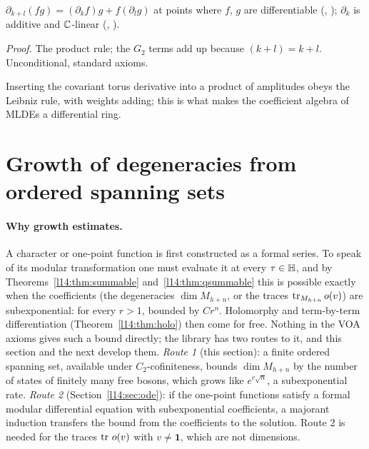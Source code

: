 \begin{proposition}\label{l14:prop:serremul}
$\partial_{k+l}(fg) = (\partial_kf)g + f(\partial_lg)$ at points where $f$, $g$ are differentiable
(, ); $\partial_k$ is additive and ${\mathbb{C}}$-linear
(, ).
\end{proposition}
\noindent\emph{Proof.} The product rule; the $G_2$ terms add up because $(k+l) = k + l$. Unconditional, standard axioms.
\begin{physics}
Inserting the covariant torus derivative into a product of amplitudes obeys the Leibniz rule, with weights adding; this is what makes the coefficient algebra of MLDEs a differential ring.
\end{physics}

\section{Growth of degeneracies from ordered spanning sets}\label{l14:sec:growth}

\paragraph{Why growth estimates.} A character or one-point function is first constructed as a formal series. To speak of its
modular transformation one must evaluate it at every $\tau\in\mathbb{H}$, and by Theorems~\ref{l14:thm:summable}
and~\ref{l14:thm:qsummable} this is possible exactly when the coefficients (the degeneracies $\dim M_{h+n}$, or the traces
$\operatorname{tr}_{M_{h+n}}o(v)$) are subexponential: for every $r>1$, bounded by $Cr^n$. Holomorphy and term-by-term differentiation
(Theorem~\ref{l14:thm:holo}) then come for free. Nothing in the VOA axioms gives such a bound directly; the library has two
routes to it, and this section and the next develop them. \emph{Route 1} (this section): a finite ordered spanning set,
available under $C_2$-cofiniteness, bounds $\dim M_{h+n}$ by the number of states of finitely many free bosons, which grows like
$e^{c\sqrt n}$, a subexponential rate. \emph{Route 2} (Section~\ref{l14:sec:ode}): if the one-point functions satisfy a formal
modular differential equation with subexponential coefficients, a majorant induction transfers the bound from the
coefficients to the solution. Route 2 is needed for the traces $\operatorname{tr}\,o(v)$ with $v\neq\mathbf 1$, which are not dimensions.

